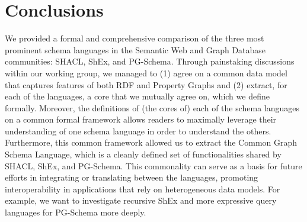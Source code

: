 \section{Conclusions}

We provided a formal and comprehensive comparison of the three most prominent schema languages in the Semantic Web and Graph Database communities: SHACL, ShEx, and PG-Schema. Through painstaking discussions within our working group, we managed to (1) agree on a common data model that captures features of both RDF and Property Graphs and (2) extract, for each of the languages, a core that we mutually agree on, which we define formally. Moreover, the definitions of (the cores of) each of the schema languages on a common formal framework allows readers to maximally leverage their understanding of one schema language in order to understand the others. Furthermore, this common framework allowed us to extract the Common Graph Schema Language, which is a cleanly defined set of functionalities shared by SHACL, ShEx, and PG-Schema. This commonality can serve as a basis for future efforts in integrating or translating between the languages, promoting interoperability in applications that rely on heterogeneous data models. For example, we want to investigate recursive ShEx and more expressive query languages for PG-Schema more deeply.





